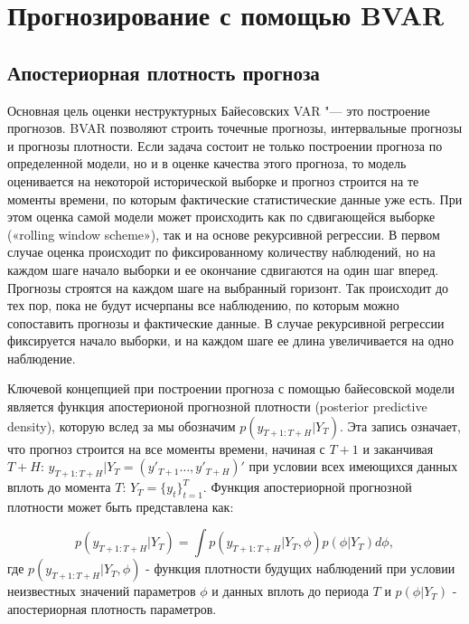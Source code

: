 \documentclass[11pt]{article} %
\begin{document}
\section{Прогнозирование с помощью BVAR}

\subsection{Апостериорная плотность прогноза}
Основная цель оценки неструктурных Байесовских VAR "--- это построение прогнозов. BVAR позволяют строить точечные прогнозы, интервальные прогнозы и  прогнозы  плотности. Если задача состоит не только построении прогноза по определенной модели, но и в оценке качества этого прогноза, то модель оценивается на некоторой исторической выборке и прогноз строится на те моменты времени, по которым фактические статистические данные уже есть. При этом оценка самой модели может происходить как по сдвигающейся выборке («rolling window scheme»), так и на основе рекурсивной регрессии. В первом случае оценка происходит по фиксированному количеству наблюдений, но на каждом шаге начало выборки и ее окончание сдвигаются на один шаг вперед. Прогнозы строятся на каждом шаге на выбранный горизонт.  Так происходит до тех пор, пока не будут исчерпаны все наблюдению, по которым можно сопоставить прогнозы и фактические данные. В случае рекурсивной регрессии фиксируется начало выборки, и на каждом шаге ее длина увеличивается на одно наблюдение.

Ключевой концепцией при построении прогноза с помощью байесовской модели является функция апостерионой прогнозной плотности (posterior predictive density), которую вслед за \cite{karlsson_2012} мы обозначим $p(y_{T+1:T+H}|Y_{T})$. Эта запись означает, что прогноз строится на все моменты времени, начиная с $T+1$ и заканчивая $T+H$: $y_{T+1:T+H}|Y_{T}=(y'_{T+1}\ldots, y'_{T+H} )'$ при условии всех имеющихся данных вплоть до момента $T$: $Y_T=\lbrace y_t\rbrace _{t=1}^{T}$. Функция апостериорной прогнозной плотности может быть представлена как:

\begin{equation}\label{predictive_density}
p(y_{T+1:T+H}|Y_{T})=\int p(y_{T+1:T+H}|Y_{T},\phi) p(\phi |Y_T) d\phi,
\end{equation}
где $p(y_{T+1:T+H}|Y_{T},\phi)$ - функция плотности будущих наблюдений при условии неизвестных значений параметров $\phi$ и данных вплоть до периода $T$ и $p(\phi |Y_T)$ - апостериорная плотность параметров.
\end{document}
